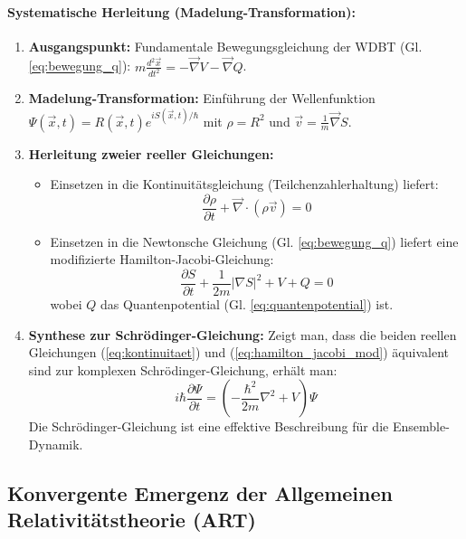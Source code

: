 \documentclass[11pt, a4paper]{article}
\begin{document}
\paragraph{Systematische Herleitung (Madelung-Transformation):}
\begin{enumerate}
    \item \textbf{Ausgangspunkt:} Fundamentale Bewegungsgleichung der WDBT (Gl. \ref{eq:bewegung_q}): $m \frac{d^2 \vec{x}}{dt^2} = -\vec{\nabla} V - \vec{\nabla} Q$.
    \item \textbf{Madelung-Transformation:} Einführung der Wellenfunktion $\Psi(\vec{x}, t) = R(\vec{x}, t) e^{i S(\vec{x}, t)/\hbar}$ mit $\rho = R^2$ und $\vec{v} = \frac{1}{m} \vec{\nabla} S$.
    \item \textbf{Herleitung zweier reeller Gleichungen:}
    \begin{itemize}
        \item Einsetzen in die Kontinuitätsgleichung (Teilchenzahlerhaltung) liefert:
        \begin{equation}
        \label{eq:kontinuitaet}
        \frac{\partial \rho}{\partial t} + \vec{\nabla} \cdot (\rho \vec{v}) = 0
        \end{equation}
        \item Einsetzen in die Newtonsche Gleichung (Gl. \ref{eq:bewegung_q}) liefert eine modifizierte Hamilton-Jacobi-Gleichung:
        \begin{equation}
        \label{eq:hamilton_jacobi_mod}
        \frac{\partial S}{\partial t} + \frac{1}{2m} |\nabla S|^2 + V + Q = 0
        \end{equation}
        wobei $Q$ das Quantenpotential (Gl. \ref{eq:quantenpotential}) ist.
    \end{itemize}
    \item \textbf{Synthese zur Schrödinger-Gleichung:} Zeigt man, dass die beiden reellen Gleichungen (\ref{eq:kontinuitaet}) und (\ref{eq:hamilton_jacobi_mod}) äquivalent sind zur komplexen Schrödinger-Gleichung, erhält man:
    \begin{equation}
    \label{eq:schroedinger}
    i\hbar \frac{\partial \Psi}{\partial t} = \left( -\frac{\hbar^2}{2m} \nabla^2 + V \right) \Psi
    \end{equation}
    Die Schrödinger-Gleichung ist eine effektive Beschreibung für die Ensemble-Dynamik.
\end{enumerate}

\subsection{Konvergente Emergenz der Allgemeinen Relativitätstheorie (ART)}
\label{subsec:emergenz_art}
\end{document}
